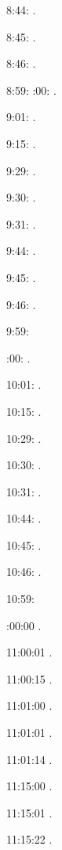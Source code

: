 \documentclass[italian]{article}
\begin{document}
8:44:   .

8:45:   .

8:46:   .

8:59:   
:00:  .

9:01:   . 

9:15:   . 

9:29:   . 

9:30:   .

9:31:   .

9:44:   .

9:45:   .

9:46:   .

9:59:   

:00:  .

10:01:   . 

10:15:   . 

10:29:   . 

10:30:   .

10:31:   .

10:44:   .

10:45:   .

10:46:   .

10:59:   

:00:00  .

11:00:01  .

11:00:15  .

11:01:00   . 

11:01:01   . 

11:01:14   . 

11:15:00   . 

11:15:01   . 

11:15:22   . 
\end{document}
